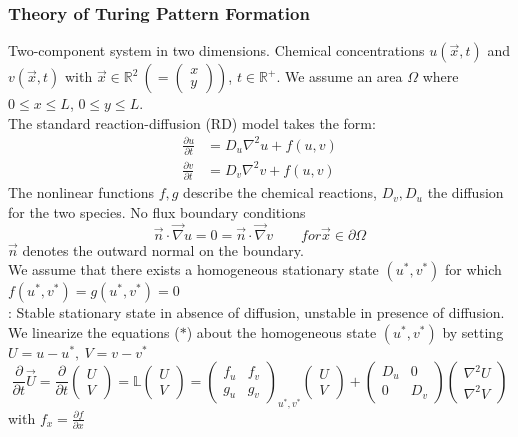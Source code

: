 \subsubsection{Theory of Turing Pattern Formation}
Two-component system in two dimensions. Chemical concentrations $u(\vec{x},t)$ and $v(\vec{x},t)$ with $\vec{x}\in\mathbb{R}^2\ \left(=\begin{pmatrix} x\\ y\end{pmatrix}\right)$, $t\in\mathbb{R}^+$. We assume an area $\Omega$ where $0\leq x \leq L$, $0\leq y\leq L$.\\
The standard reaction-diffusion (RD) model takes the form:
\begin{align*}
	\frac{\partial u}{\partial t}&=D_u\nabla^2u +f(u,v)\\
	\frac{\partial v}{\partial t}&=D_v\nabla^2v+f(u,v)
\end{align*}
The nonlinear functions $f,g$ describe the chemical reactions, $D_v,D_u$ the diffusion for the two species. No flux boundary conditions
\begin{equation*}
	\vec{n}\cdot\vec{\nabla}u=0=\vec{n}\cdot\vec{\nabla} v\qquad for \vec{x}\in\partial\Omega
\end{equation*}
$\vec{n}$ denotes the outward normal on the boundary.\\
We assume that there exists a homogeneous stationary state $(u^*,v^\ast)$ for which $f(u^\ast,v^\ast)=g(u^\ast,v^\ast)=0$\vspace{1mm}\\
\textbf{\underline{}}: Stable stationary state in absence of diffusion, unstable in presence of diffusion. We linearize the equations ($*$) about the homogeneous state $(u^*,v^*)$ by setting $U=u-u^*,\ V=v-v^*$
\begin{equation*}
	\frac{\partial}{\partial t}\vec{U}=\frac{\partial}{\partial t}\begin{pmatrix} U\\ V \end{pmatrix} = \mathbb{L}\begin{pmatrix}U\\ V\end{pmatrix}=\begin{pmatrix}f_u&f_v\\ g_u&g_v\end{pmatrix}_{u^*,v^*}\begin{pmatrix}U\\ V\end{pmatrix}+\begin{pmatrix}D_u&0\\ 0&D_v\end{pmatrix}\begin{pmatrix}\nabla^2 U\\\nabla^2 V\end{pmatrix}
\end{equation*}
with $f_x=\frac{\partial f}{\partial x}$\\
